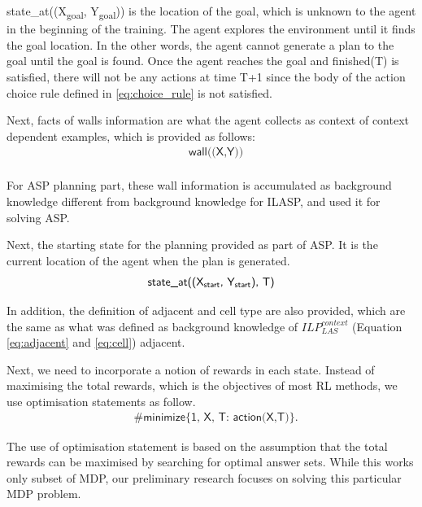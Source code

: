 \textsf{state\_at((X\textsubscript{goal}, Y\textsubscript{goal}))} is the location of the goal, which is unknown to the agent in the beginning of the training.
The agent explores the environment until it finds the goal location.
In the other words, the agent cannot generate a plan to the goal until the goal is found. 
Once the agent reaches the goal and \textsf{finished(T)} is satisfied, 
there will not be any actions at time T+1 since the body of the action choice rule defined in \ref{eq:choice_rule} is not satisfied.

Next, facts of walls information are what the agent collects as context of context dependent examples, which is provided as follows:
\begin{equation}
\begin{split}
&\textsf{wall((X,Y))}\\
\end{split}
\end{equation}
 
For ASP planning part, these wall information is accumulated as background knowledge different from background knowledge for ILASP, and used it for solving ASP. 

Next, the starting state for the planning provided as part of ASP. It is the current location of the agent when the plan is generated.
\begin{equation}
\begin{split}
\textsf{state\_at((X\textsubscript{start}, Y\textsubscript{start}), T)}
\end{split}
\end{equation}

In addition, the definition of adjacent and cell type are also provided, which are the same as what was defined as background knowledge of $ILP_{LAS}^{context}$ (Equation \ref{eq:adjacent} and \ref{eq:cell})
adjacent.

Next, we need to incorporate a notion of rewards in each state. Instead of maximising the total rewards, which is the objectives of most RL methods, 
we use optimisation statements as follow. 
\begin{equation}
\begin{split}
&\textsf{\#minimize\{1, X, T: action(X,T)\}}.
\end{split}
\end{equation}

The use of optimisation statement is based on the assumption that the total rewards can be maximised by searching for optimal answer sets. 
While this works only subset of MDP, our preliminary research focuses on solving this particular MDP problem. 
    
